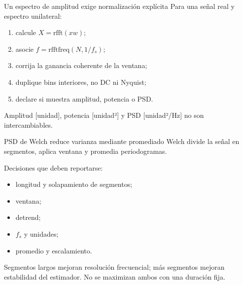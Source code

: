 \documentclass[
  ignorenonframetext,
  aspectratio=169,
  spanish,
  professionalfonts]{beamer}
\providecommand{\tightlist}{%
  \setlength{\itemsep}{0pt}\setlength{\parskip}{0pt}}
\begin{document}
\begin{frame}{Un espectro de amplitud exige normalización explícita}
\protect{}\label{un-espectro-de-amplitud-exige-normalizaciuxf3n-expluxedcita}
Para una señal real y espectro unilateral:

\begin{enumerate}
\tightlist
\item
  calcule \(X=\mathrm{rfft}(xw)\);
\item
  asocie \(f=\mathrm{rfftfreq}(N,1/f_s)\);
\item
  corrija la ganancia coherente de la ventana;
\item
  duplique bins interiores, no DC ni Nyquist;
\item
  declare si muestra amplitud, potencia o PSD.
\end{enumerate}

\begin{tcolorbox}[enhanced jigsaw, arc=.35mm, bottomrule=.15mm, bottomtitle=1mm, breakable, colback=white, colbacktitle=quarto-callout-warning-color!10!white, colframe=quarto-callout-warning-color-frame, coltitle=black, left=2mm, leftrule=.75mm, opacityback=0, opacitybacktitle=0.6, rightrule=.15mm, title={Unidades}, titlerule=0mm, toprule=.15mm, toptitle=1mm]

Amplitud {[}unidad{]}, potencia {[}unidad²{]} y PSD {[}unidad²/Hz{]} no
son intercambiables.

\end{tcolorbox}
\end{frame}

\begin{frame}{PSD de Welch reduce varianza mediante promediado}
\protect{}\label{psd-de-welch-reduce-varianza-mediante-promediado}
Welch divide la señal en segmentos, aplica ventana y promedia
periodogramas.

Decisiones que deben reportarse:

\begin{itemize}
\tightlist
\item
  longitud y solapamiento de segmentos;
\item
  ventana;
\item
  detrend;
\item
  \(f_s\) y unidades;
\item
  promedio y escalamiento.
\end{itemize}

\begin{tcolorbox}[enhanced jigsaw, arc=.35mm, bottomrule=.15mm, bottomtitle=1mm, breakable, colback=white, colbacktitle=quarto-callout-important-color!10!white, colframe=quarto-callout-important-color-frame, coltitle=black, left=2mm, leftrule=.75mm, opacityback=0, opacitybacktitle=0.6, rightrule=.15mm, title={Compromiso}, titlerule=0mm, toprule=.15mm, toptitle=1mm]

Segmentos largos mejoran resolución frecuencial; más segmentos mejoran
estabilidad del estimador. No se maximizan ambos con una duración fija.

\end{tcolorbox}
\end{frame}
\end{document}
